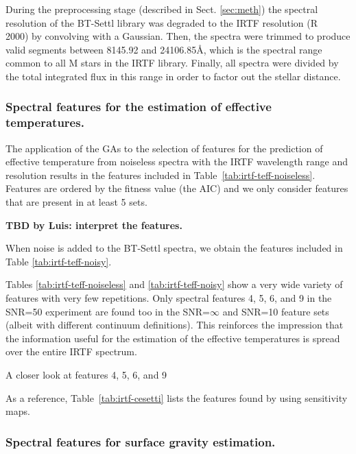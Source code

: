 
During the preprocessing stage (described in Sect. \ref{sec:meth}) the
spectral resolution of the BT-Settl library was degraded to the IRTF
resolution (R ~ 2000) by convolving with a Gaussian. Then, the spectra
were trimmed to produce valid segments between 8145.92 and
24106.85{\AA}, which is the spectral range common to all M stars in
the IRTF library. Finally, all spectra were divided by the total
integrated flux in this range in order to factor out the stellar
distance.

\subsubsection{Spectral features for the estimation of effective temperatures.}

The application of the GAs to the selection of features for the
prediction of effective temperature from noiseless spectra with the
IRTF wavelength range and resolution results in the features included
in Table~\ref{tab:irtf-teff-noiseless}. Features are ordered by the
fitness value (the AIC) and we only consider features that are present
in at least 5 sets.

{\bf TBD by Luis: interpret the features.}

When noise is added to the BT-Settl spectra, we obtain the features included in Table \ref{tab:irtf-teff-noisy}.


Tables \ref{tab:irtf-teff-noiseless} and \ref{tab:irtf-teff-noisy}
show a very wide variety of features with very few repetitions. Only
spectral features 4, 5, 6, and 9 in the SNR=50 experiment are found
too in the SNR=$\infty$ and SNR=10 feature sets (albeit with different
continuum definitions). This reinforces the impression that the
information useful for the estimation of the effective temperatures is
spread over the entire IRTF spectrum.

A closer look at features 4, 5, 6, and 9 

As a reference, Table~\ref{tab:irtf-cesetti} lists the features found
by \cite{cesetti} using sensitivity maps.


\subsubsection{Spectral features for surface gravity estimation.}

